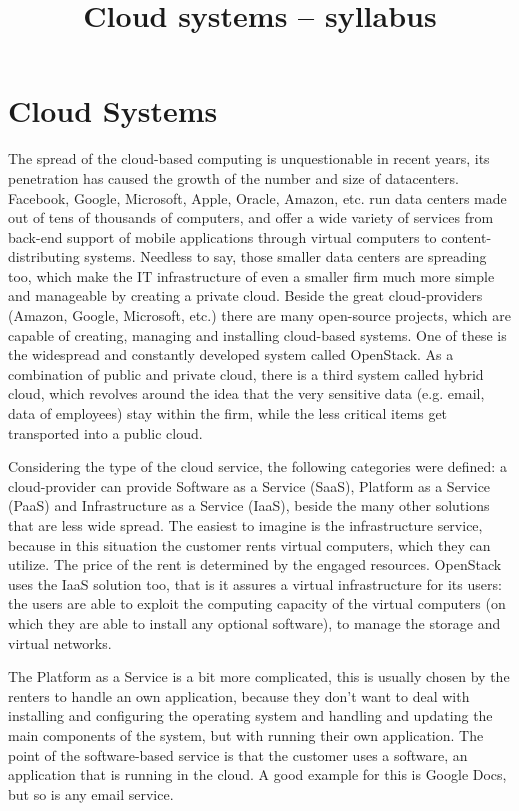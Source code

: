\documentclass[a4paper]{article}
\title{Cloud systems – syllabus}
\author{}
\date{}
\begin{document}
\maketitle

\tableofcontents

\section{Cloud Systems}

The spread of the cloud-based computing is unquestionable in recent years, its penetration has caused the growth of the
number and size of datacenters. Facebook, Google, Microsoft, Apple, Oracle, Amazon, etc. run data centers made out of
tens of thousands of computers, and offer a wide variety of services from back-end support of mobile applications
through virtual computers to content-distributing systems. Needless to say, those smaller data centers are spreading
too, which make the IT infrastructure of even a smaller firm much more simple and manageable by creating a private
cloud. Beside the great cloud-providers (Amazon, Google, Microsoft, etc.) there are many open-source projects, which
are capable of creating, managing and installing cloud-based systems. One of these is the widespread and constantly
developed system called OpenStack. As a combination of public and private cloud, there is a third system called hybrid
cloud, which revolves around the idea that the very sensitive data (e.g. email, data of employees) stay within the
firm, while the less critical items get transported into a public cloud.

Considering the type of the cloud service, the following categories were defined: a cloud-provider can provide Software
as a Service (SaaS), Platform as a Service (PaaS) and Infrastructure as a Service (IaaS), beside the many other
solutions that are less wide spread. The easiest to imagine is the infrastructure service, because in this situation
the customer rents virtual computers, which they can utilize. The price of the rent is determined by the engaged
resources. OpenStack uses the IaaS solution too, that is it assures a virtual infrastructure for its users: the users
are able to exploit the computing capacity of the virtual computers (on which they are able to install any optional
software), to manage the storage and virtual networks.

The Platform as a Service is a bit more complicated, this is usually chosen by the renters to handle an own
application, because they don't want to deal with installing and configuring the operating system and handling and
updating the main components of the system, but with running their own application. The point of the software-based
service is that the customer uses a software, an application that is running in the cloud. A good example for this is
Google Docs, but so is any email service.
\end{document}
